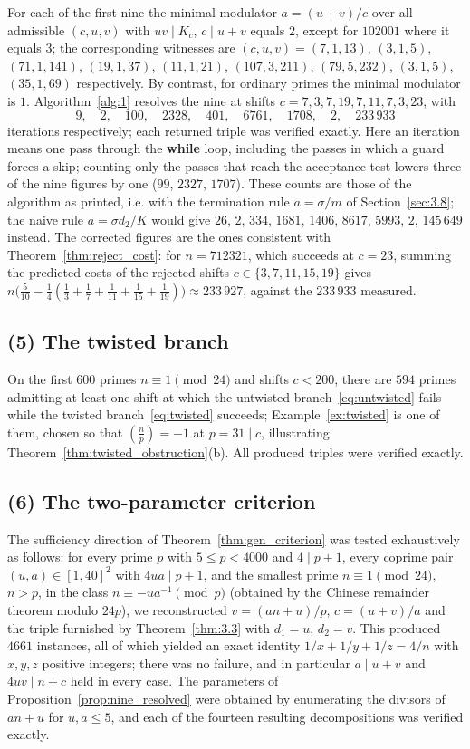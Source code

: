 \documentclass[11pt, a4paper]{article}
\theoremstyle{plain}
\theoremstyle{definition}
\newcommand{\leg}[2]{\left(\frac{#1}{#2}\right)}
\begin{document}
For each of the first nine the minimal modulator $a=(u+v)/c$ over all admissible $(c,u,v)$ with $uv\mid K_c$, $c\mid u+v$ equals $2$, except for $102001$ where it equals $3$; the corresponding witnesses are $(c,u,v)=(7,1,13)$, $(3,1,5)$, $(71,1,141)$, $(19,1,37)$, $(11,1,21)$, $(107,3,211)$, $(79,5,232)$, $(3,1,5)$, $(35,1,69)$ respectively. By contrast, for ordinary primes the minimal modulator is $1$. Algorithm~\ref{alg:1} resolves the nine at shifts $c=7,3,7,19,7,11,7,3,23$, with
$$9,\quad 2,\quad 100,\quad 2328,\quad 401,\quad 6761,\quad 1708,\quad 2,\quad 233\,933$$
iterations respectively; each returned triple was verified exactly. Here an iteration means one pass through the \textbf{while} loop, including the passes in which a guard forces a skip; counting only the passes that reach the acceptance test lowers three of the nine figures by one ($99$, $2327$, $1707$). These counts are those of the algorithm as printed, i.e. with the termination rule $a=\sigma/m$ of Section~\ref{sec:3.8}; the naive rule $a=\sigma d_2/K$ would give $26$, $2$, $334$, $1681$, $1406$, $8617$, $5993$, $2$, $145\,649$ instead. The corrected figures are the ones consistent with Theorem~\ref{thm:reject_cost}: for $n=712321$, which succeeds at $c=23$, summing the predicted costs of the rejected shifts $c\in\{3,7,11,15,19\}$ gives $n\big(\tfrac5{10}-\tfrac14(\tfrac13+\tfrac17+\tfrac1{11}+\tfrac1{15}+\tfrac1{19})\big)\approx233\,927$, against the $233\,933$ measured.

\subsection*{(5) The twisted branch}
On the first $600$ primes $n\equiv1\pmod{24}$ and shifts $c<200$, there are $594$ primes admitting at least one shift at which the untwisted branch~\eqref{eq:untwisted} fails while the twisted branch~\eqref{eq:twisted} succeeds; Example~\ref{ex:twisted} is one of them, chosen so that $\leg np=-1$ at $p=31\mid c$, illustrating Theorem~\ref{thm:twisted_obstruction}(b). All produced triples were verified exactly.

\subsection*{(6) The two-parameter criterion}
The sufficiency direction of Theorem~\ref{thm:gen_criterion} was tested exhaustively as follows: for every prime $p$ with $5\le p<4000$ and $4\mid p+1$, every coprime pair $(u,a)\in[1,40]^{2}$ with $4ua\mid p+1$, and the smallest prime $n\equiv1\pmod{24}$, $n>p$, in the class $n\equiv-ua^{-1}\pmod p$ (obtained by the Chinese remainder theorem modulo $24p$), we reconstructed $v=(an+u)/p$, $c=(u+v)/a$ and the triple furnished by Theorem~\ref{thm:3.3} with $d_1=u$, $d_2=v$. This produced $4661$ instances, all of which yielded an exact identity $1/x+1/y+1/z=4/n$ with $x,y,z$ positive integers; there was no failure, and in particular $a\mid u+v$ and $4uv\mid n+c$ held in every case. The parameters of Proposition~\ref{prop:nine_resolved} were obtained by enumerating the divisors of $an+u$ for $u,a\le 5$, and each of the fourteen resulting decompositions was verified exactly.
\end{document}
